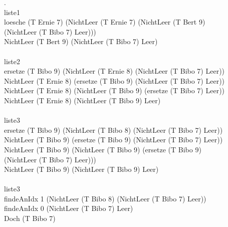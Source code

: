 \documentclass[a4paper, 12pt, ngerman]{article}
\begin{document}
\newpage{}.\\
liste1\\
loesche (T Ernie 7) (NichtLeer (T Ernie 7) (NichtLeer (T Bert 9)\\
(NichtLeer (T Bibo 7) Leer)))\\
NichtLeer (T Bert 9) (NichtLeer (T Bibo 7) Leer)\\
\noindent\\
liste2\\
ersetze (T Bibo 9) (NichtLeer (T Ernie 8) (NichtLeer (T Bibo 7) Leer))\\
NichtLeer (T Ernie 8) (ersetze (T Bibo 9) (NichtLeer (T Bibo 7) Leer))\\
NichtLeer (T Ernie 8) (NichtLeer (T Bibo 9) (ersetze (T Bibo 7) Leer))\\
NichtLeer (T Ernie 8) (NichtLeer (T Bibo 9) Leer)\\
\noindent\\
liste3\\
ersetze (T Bibo 9) (NichtLeer (T Bibo 8) (NichtLeer (T Bibo 7) Leer))\\
NichtLeer (T Bibo 9) (ersetze (T Bibo 9) (NichtLeer (T Bibo 7) Leer))\\
NichtLeer (T Bibo 9) (NichtLeer (T Bibo 9) (ersetze (T Bibo 9)\\
(NichtLeer (T Bibo 7) Leer)))\\
NichtLeer (T Bibo 9) (NichtLeer (T Bibo 9) Leer)\\
\noindent\\
liste3\\
findeAnIdx 1 (NichtLeer (T Bibo 8) (NichtLeer (T Bibo 7) Leer))\\
findeAnIdx 0 (NichtLeer (T Bibo 7) Leer)\\
Doch (T Bibo 7)
\end{document}
